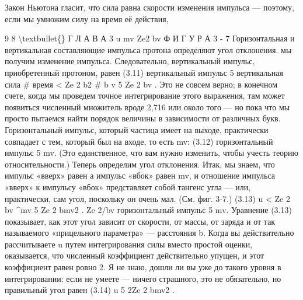 \documentclass[10pt,oneside]{article}
\begin{document}
Закон Ньютона гласит, что сила равна скорости изменения импульса --- поэтому, если мы умножим силу на время её действия,\par

9 8 \textbackslash{}textbullet\{\} Г Л А В А  3 u mv Ze2 bv Ф И Г У Р А  3 - 7 Горизонтальная и вертикальная составляющие импульса протона определяют угол отклонения. мы получим изменение импульса. Следовательно, вертикальный импульс, приобретенный протоном, равен (3.11) вертикальный импульс 5 вертикальная сила \# время < Ze 2 b2 \# b v 5 Ze 2 bv . Это не совсем верно; в конечном счете, когда мы проведем точное интегрирование этого выражения, там может появиться численный множитель вроде 2,716 или около того --- но пока что мы просто пытаемся найти порядок величины в зависимости от различных букв. Горизонтальный импульс, который частица имеет на выходе, практически совпадает с тем, который был на входе, то есть mv: (3.12) горизонтальный импульс 5 mv. (Это единственное, что вам нужно изменить, чтобы учесть теорию относительности.) Теперь определим угол отклонения. Итак, мы знаем, что импульс «вверх» равен а импульс «вбок» равен mv, и отношение импульса «вверх» к импульсу «вбок» представляет собой тангенс угла --- или, практически, сам угол, поскольку он очень мал. (См. фиг. 3-7.) (3.13) u < Ze 2 bv \textasciicircum{}mv 5 Ze 2 bmv2 . Ze 2/bv горизонтальный импульс 5 mv. Уравнение (3.13) показывает, как этот угол зависит от скорости, от массы, от заряда и от так называемого «прицельного параметра» --- расстояния b. Когда вы действительно рассчитываете u путем интегрирования силы вместо простой оценки, оказывается, что численный коэффициент действительно упущен, и этот коэффициент равен ровно 2. Я не знаю, дошли ли вы уже до такого уровня в интегрировании: если не умеете --- ничего страшного, это не обязательно, но правильный угол равен (3.14) u 5 2Ze 2 bmv2 .\par
\end{document}
